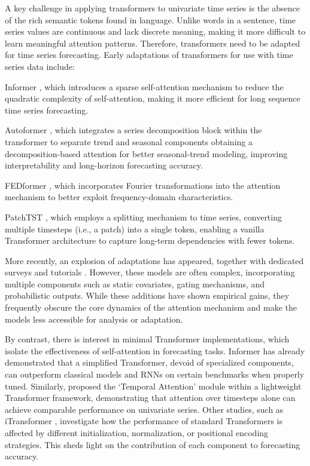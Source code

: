 \documentclass[algorithms,article,submit,pdftex,moreauthors]{Definitions/mdpi}
\begin{document}
A key challenge in applying transformers to univariate time series is the absence of the rich semantic tokens found in language. Unlike words in a sentence, time series values are continuous and lack discrete meaning, making it more difficult to learn meaningful attention patterns. Therefore, transformers need to be adapted for time series forecasting. Early adaptations of transformers for use with time series data include:

\begin{description}
	\item Informer \citep{ZZPZ21}, which introduces a sparse self-attention mechanism to reduce the quadratic complexity of self-attention, making it more efficient for long sequence time series forecasting.

	\item Autoformer \citep{WXWL22}, which integrates a series decomposition block within the transformer to separate trend and seasonal components obtaining a decomposition-based attention for better seasonal-trend modeling, improving interpretability and long-horizon forecasting accuracy.

	\item FEDformer \citep{ZMWW22}, which incorporates Fourier transformations into the attention mechanism to better exploit frequency-domain characteristics.

	\item PatchTST \citep{patchTST}, which employs a splitting mechanism to time series, converting multiple timesteps (i.e., a patch) into a single token, enabling a vanilla Transformer architecture to capture long-term dependencies with fewer tokens. 
\end{description}

More recently, an explosion of adaptations has appeared, together with dedicated surveys and tutorials \cite{ WZZC23, ANTS23, SZLW25}. However, these models are often complex, incorporating multiple components such as static covariates, gating mechanisms, and probabilistic outputs. While these additions have shown empirical gains, they frequently obscure the core dynamics of the attention mechanism and make the models less accessible for analysis or adaptation.

By contrast, there is interest in minimal Transformer implementations, which isolate the effectiveness of self-attention in forecasting tasks. Informer has already demonstrated that a simplified Transformer, devoid of specialized components, can outperform classical models and RNNs on certain benchmarks when properly tuned. Similarly, \citep{LSNP21} proposed the `Temporal Attention' module within a lightweight Transformer framework, demonstrating that attention over timesteps alone can achieve comparable performance on univariate series. Other studies, such as iTransformer \cite{LHZW24}, investigate how the performance of standard Transformers is affected by different initialization, normalization, or positional encoding strategies. This sheds light on the contribution of each component to forecasting accuracy.
\end{document}
